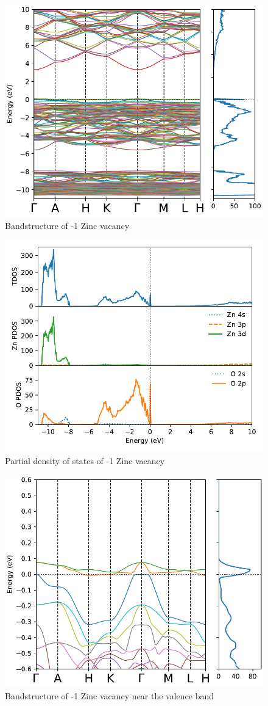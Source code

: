 \begin{figure}[tbh!]
	\centering
	\includegraphics[width=0.6\linewidth]{"images/rnd/band-dos_Zn_vac-n1"}
	\caption[Bandstructure of -1 Zinc vacancy]{Bandstructure of -1 Zinc vacancy}
\end{figure}

\begin{figure}[tbh!]
	\centering
	\includegraphics[width=0.6\linewidth]{"images/rnd/dos-pdos_Zn_vac-n1"}
	\caption[Partial density of states of -1 Zinc vacancy]{Partial density of states of -1 Zinc vacancy}
\end{figure}

\begin{figure}[tbh!]
	\centering
	\includegraphics[width=0.6\linewidth]{"images/rnd/band-dos-close_Zn_vac-n1"}
	\caption[Bandstructure of -1 Zinc vacancy near the valence band]{Bandstructure of -1 Zinc vacancy near the valence band}
\end{figure}

